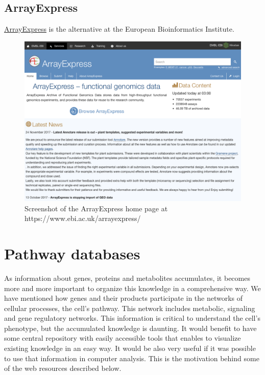 \documentclass[]{book}
\theoremstyle{definition}
\theoremstyle{definition}
\theoremstyle{definition}
\theoremstyle{remark}
\begin{document}
\subsection{ArrayExpress}\label{arrayexpress}

\href{https://www.ebi.ac.uk/arrayexpress/}{ArrayExpress} is the
alternative at the European Bioinformatics Institute.

\begin{figure}
\includegraphics[width=16.51in]{pic/ae_web} \caption{Screenshot of the ArrayExpress home page at https://www.ebi.ac.uk/arrayexpress/}\label{fig:ae-web}
\end{figure}

\section{Pathway databases}\label{pathway-databases}

As information about genes, proteins and metabolites accumulates, it
becomes more and more important to organize this knowledge in a
comprehensive way. We have mentioned how genes and their products
participate in the networks of cellular processes, the cell's pathway.
This network includes metabolic, signaling and gene regulatory networks.
This information is critical to understand the cell's phenotype, but the
accumulated knowledge is daunting. It would benefit to have some central
repository with easily accessible tools that enables to visualize
existing knowledge in an easy way. It would be also very useful if it
was possible to use that information in computer analysis. This is the
motivation behind some of the web resources described below.
\end{document}
